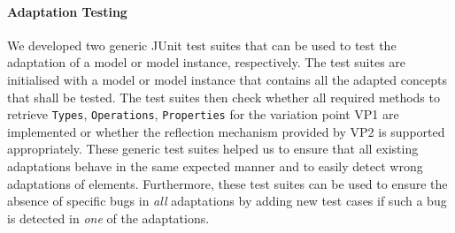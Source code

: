 	\paragraph{Adaptation Testing}
	We developed two generic JUnit test suites 
	that can be used to test the adaptation of a model 
	or model instance, respectively. 
	The test suites are initialised with a model or model instance that
	contains all the adapted concepts that shall be tested.
	The test suites then check whether all required methods to 
	retrieve \texttt{Types}, \texttt{Operations}, \texttt{Properties} for the variation point VP1 are implemented or whether the reflection mechanism
	provided by VP2 is supported appropriately.
	These generic test suites helped us to ensure 
	that all existing adaptations behave in the same expected manner
	and to easily detect wrong adaptations of elements.
	Furthermore, these test suites can be used to ensure the absence of specific
	bugs in \emph{all} adaptations by adding new test cases if such a bug is detected in \emph{one} of the adaptations.
